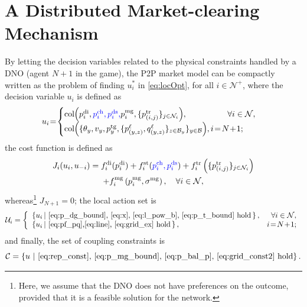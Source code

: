 \documentclass{IEEEtran}  %
\newtheorem{definition}{Definition}
\newcommand{\mc}{\mathcal}
\newcommand{\col}{\operatorname{col}}
\newcommand{\0}{\mathbf{0}}
\newcommand{\1}{\mathbf{1}}
\newcommand{\edit}[1]{\color{blue}{#1}\color{black}}
\begin{document}
\section{A Distributed Market-clearing Mechanism}
\label{sub:alg}
	By letting the decision variables related to the physical constraints handled by a DNO (agent $N+1$ in the game), the P2P market model can be compactly written as the problem of finding $u_i^*$ in \eqref{eq:locOpt}, for all $i \in \mc N^+$, where the decision variable $u_i$ is defined as
$$u_i \hspace{-2pt} = \hspace{-2pt}\begin{cases} \col\hspace{-2pt}\left(p_{i}^{\mathrm{di}},\edit{p_{i}^{\mathrm{ch}},p_{i}^{\mathrm{ds}}, } p_{i}^{\mathrm{mg}},\{p_{(i,j)}^{\mathrm {tr}}\}_{j\in \mc N_i}\right)\hspace{-2pt}, \ \qquad \qquad \; \; \forall  i \in \mc N,\\
	\col\hspace{-2pt}\left(\{\theta_y, v_y, p_y^{\mathrm{tg}},\{p_{(y,z)}^{\ell},q_{(y,z)}^{\ell}\}_{z \in \mc B_y} \}_{y\in\mc B} \right)\hspace{-2pt},   i\!=\! N\!+\!1;
	\end{cases}$$ 
the cost function is defined as
	\begin{multline}
	J_i(u_i,u_{-i}) =
f_{i}^{\mathrm{di}}(p_{i}^{\mathrm{di}}) + f_{i}^{\mathrm{st}}(\edit{p_{i}^{\mathrm{ch}},p_{i}^{\mathrm{ds}}})+ f_{i}^{\mathrm{tr}} \left( \{ p_{(i,j)}^{\mathrm{tr}} \}_{j \in \mc N_i} \right)\\
    + f_{i}^{\mathrm{mg}}\left( p_{i}^{\mathrm{mg}},\sigma^{\textrm{mg}} \right), \quad \forall  i \in \mc N,
 \label{eq:cost_def}
	\end{multline}
whereas\footnote{Here, we assume that the DNO does not have preferences on the outcome, provided that it is a feasible solution for the network.} $J_{N+1}=0$; the local action set is
\begin{align}
\label{eq:constr_def}
\mc U_i =
\left\{
\begin{array}{l r}
\left\{u_i \,|~ \text{\eqref{eq:p_dg_bound}, \eqref{eq:x}, \eqref{eq:l_pow_b}, \eqref{eq:p_t_bound} hold} \, \right\}, & \forall i \in \mc N, \\
\left\{ u_i \,|~ \text{\eqref{eq:pf_pq},\eqref{eq:line}, \eqref{eq:grid_ex} hold} \,\right\}, & i\!=\!N\!+\!1;
\end{array}
\right.
\end{align}
and finally, the set of coupling constraints is 
\begin{equation}
\label{eq:Cconstr_def}
\mc C = \left\{
u~|~ \text{\eqref{eq:rep_const}, \eqref{eq:p_mg_bound}, \eqref{eq:p_bal_p}, \eqref{eq:grid_const2} hold}
\right\}.
\end{equation}
\end{document}
